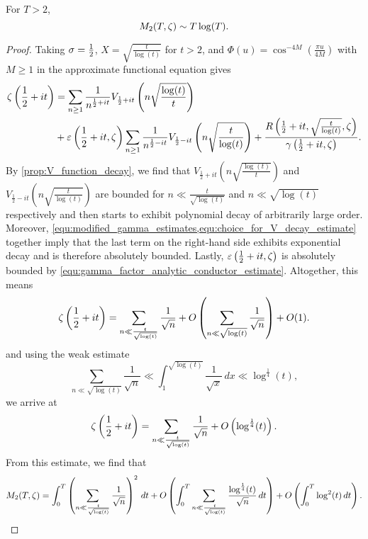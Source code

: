     \begin{theorem}
      For $T > 2$,
      \[
        M_{2}(T,\zeta) \sim T\log(T).
      \]
    \end{theorem}
    \begin{proof}
      Taking $\sigma = \frac{1}{2}$, $X = \sqrt{\frac{t}{\log(t)}}$ for $t > 2$, and $\Phi(u) = \cos^{-4M}\left(\frac{\pi u}{4M}\right)$ with $M \ge 1$ in the approximate functional equation gives
      \begin{align*}
        \zeta\left(\frac{1}{2}+it\right) &= \sum_{n \ge 1}\frac{1}{n^{\frac{1}{2}+it}}V_{\frac{1}{2}+it}\left(n\sqrt{\frac{\log(t)}{t}}\right) \\
        &+ \varepsilon\left(\frac{1}{2}+it,\zeta\right)\sum_{n \ge 1}\frac{1}{n^{\frac{1}{2}-it}}V_{\frac{1}{2}-it}\left(n\sqrt{\frac{t}{\log(t)}}\right)+\frac{R\left(\frac{1}{2}+it,\sqrt{\frac{t}{\log(t)}},\zeta\right)}{\gamma\left(\frac{1}{2}+it,\zeta\right)}.
      \end{align*}
      By \cref{prop:V_function_decay}, we find that $V_{\frac{1}{2}+it}\left(n\sqrt{\frac{\log(t)}{t}}\right)$ and $V_{\frac{1}{2}-it}\left(n\sqrt{\frac{t}{\log(t)}}\right)$ are bounded for $n \ll \frac{t}{\sqrt{\log(t)}}$ and $n \ll \sqrt{\log(t)}$ respectively and then starts to exhibit polynomial decay of arbitrarily large order. Moreover, \cref{equ:modified_gamma_estimates,equ:choice_for_V_decay_estimate} together imply that the last term on the right-hand side exhibits exponential decay and is therefore absolutely bounded. Lastly, $\varepsilon\left(\frac{1}{2}+it,\zeta\right)$ is absolutely bounded by \cref{equ:gamma_factor_analytic_conductor_estimate}. Altogether, this means
      \[
        \zeta\left(\frac{1}{2}+it\right) = \sum_{n \ll \frac{t}{\sqrt{\log(t)}}}\frac{1}{\sqrt{n}}+O\left(\sum_{n \ll \sqrt{\log(t)}}\frac{1}{\sqrt{n}}\right)+O(1).
      \]
      and using the weak estimate
      \[
        \sum_{n \ll \sqrt{\log(t)}}\frac{1}{\sqrt{n}} \ll \int_{1}^{\sqrt{\log(t)}}\frac{1}{\sqrt{x}}\,dx \ll \log^{\frac{1}{4}}(t),
      \]
      we arrive at
      \[
        \zeta\left(\frac{1}{2}+it\right) = \sum_{n \ll \frac{t}{\sqrt{\log(t)}}}\frac{1}{\sqrt{n}}+O\left(\log^{\frac{1}{4}}(t)\right).
      \]
      From this estimate, we find that
      \[
        M_{2}(T,\zeta) = \int_{0}^{T}\left(\sum_{n \ll \frac{t}{\sqrt{\log(t)}}}\frac{1}{\sqrt{n}}\right)^{2}\,dt+O\left(\int_{0}^{T}\sum_{n \ll \frac{t}{\sqrt{\log(t)}}}\frac{\log^{\frac{1}{4}}(t)}{\sqrt{n}}\,dt\right)+O\left(\int_{0}^{T}\log^{2}(t)\,dt\right).
      \]
    \end{proof}